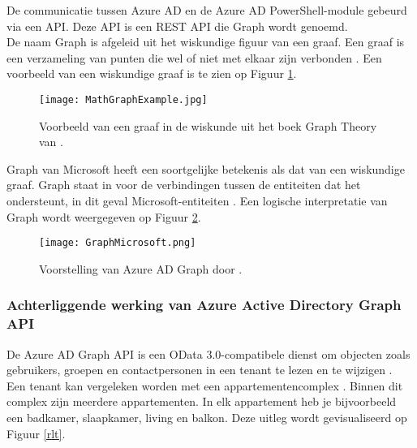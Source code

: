 De communicatie tussen Azure \ac{AD} en de Azure \ac{AD} PowerShell-module gebeurd via een \ac{API}. Deze \ac{API} is een \ac{REST} \ac{API} die Graph wordt genoemd. \\ 

De naam Graph is afgeleid uit het wiskundige figuur van een graaf. Een graaf is een verzameling van punten die wel of niet met elkaar zijn verbonden \autocite{Denaux2022}. Een voorbeeld van een wiskundige graaf is te zien op Figuur \ref{mga}. \\

\begin{figure}[!b]
    \texttt{[image: MathGraphExample.jpg]}
    \caption[Voorbeeld wiskundige graaf]{Voorbeeld van een graaf in de wiskunde uit het boek Graph Theory van \textcite{Diestel2010}.}
    \label{mga}
\end{figure}

Graph van Microsoft heeft een soortgelijke betekenis als dat van een wiskundige graaf. Graph staat in voor de verbindingen tussen de entiteiten dat het ondersteunt, in dit geval Microsoft-entiteiten \autocite{Kokkarinen2022}. Een logische interpretatie van Graph wordt weergegeven op Figuur \ref{gms}. \\

\begin{figure}[!b]
    \texttt{[image: GraphMicrosoft.png]}
    \caption[Voorbeeld Azure AD Graph]{Voorstelling van Azure \Ac{AD} Graph door \textcite{Microsoft2017}.}
    \label{gms}
\end{figure}

\subsubsection{Achterliggende werking van Azure Active Directory Graph API}



De Azure \ac{AD} Graph \ac{API} is een OData 3.0-compatibele dienst om objecten zoals gebruikers, groepen en contactpersonen in een tenant te lezen en te wijzigen \autocite{Microsoft2016}. \\

Een tenant kan vergeleken worden met een appartementencomplex \autocite{Saxton2015}. Binnen dit complex zijn meerdere appartementen. In elk appartement heb je bijvoorbeeld een badkamer, slaapkamer, living en balkon. Deze uitleg wordt gevisualiseerd op Figuur \ref{rlt}. \\

